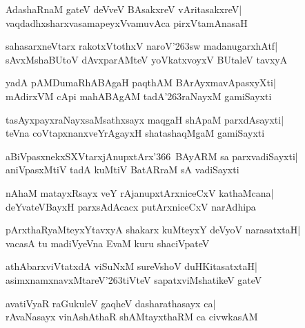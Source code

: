 \documentclass[twoside,12pt,openright]{book}
\def\S{\char'263}
\newcounter{shloka}[chapter]
\begin{document}
\begin{shloka}%
AdashaRnaM gateV deVveV BAsakxreV vAritasakxreV|\\
vaqdadhxsharxvasamapeyxVvamuvAca pirxVtamAnasaH
\end{shloka}

\begin{shloka}%
sahasarxneVtarx rakotxVtothxV naroV\S sw madanugarxhAtf|\\
sAvxMshaBUtoV dAvxparAMteV yoVkatxvoyxV BUtaleV tavxyA
\end{shloka}

\begin{shloka}%
yadA pAMDumaRhABAgaH paqthAM BArAyxmavApasxyXti|\\
mAdirxVM cApi mahABAgAM tadA\S raNayxM gamiSayxti
\end{shloka}

\begin{shloka}%
tasAyxpayxraNayxsaMsathxsayx maqgaH shApaM parxdAsayxti|\\
teVna coVtapxnanxveYrAgayxH shatashaqMgaM gamiSayxti
\end{shloka}

\begin{shloka}%
aBiVpasxnekxSXVtarxjAnupxtArx\char'366\ BAyARM sa parxvadiSayxti|\\
aniVpasxMtiV tadA kuMtiV BatARraM sA vadiSayxti
\end{shloka}

\begin{shloka}%
nAhaM matayxRsayx veY rAjanupxtArxniceCxV kathaMcana|\\
deYvateVBayxH parxsAdAcacx putArxniceCxV narAdhipa
\end{shloka}

\begin{shloka}%
pArxthaRyaMteyxYtavxyA shakarx kuMteyxY deVyoV narasatxtaH|\\
vacasA tu madiVyeVna EvaM kuru shaciVpateV
\end{shloka}

\begin{shloka}%
athAbarxviVtatxdA viSuNxM sureVshoV duHKitasatxtaH|\\
asimxnamxnavxMtareV\S tiVteV sapatxviMshatikeV gateV
\end{shloka}

\begin{shloka}%
avatiVyaR raGukuleV gaqheV dasharathasayx ca|\\
rAvaNasayx vinAshAthaR shAMtayxthaRM ca civwkasAM
\end{shloka}
\end{document}
